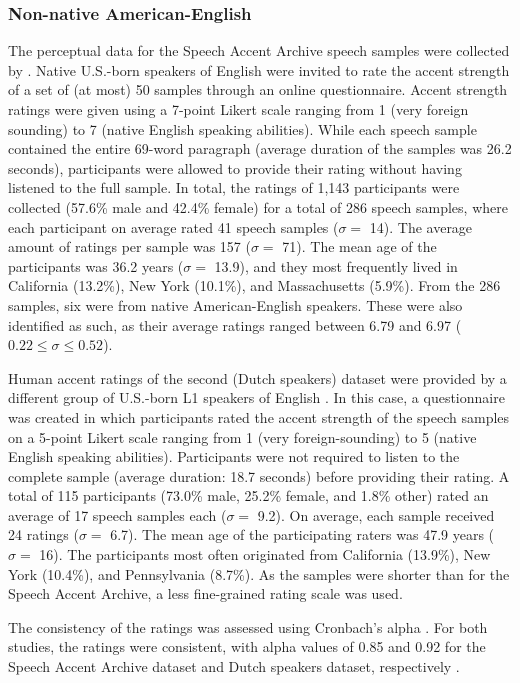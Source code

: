 \documentclass[11pt,a4paper]{article}
\begin{document}
\subsubsection{Non-native American-English}
The perceptual data for the Speech Accent Archive speech samples were collected by \citet{wieling2014a}. 
Native U.S.-born speakers of English were invited to rate the accent strength of a set of (at most) 50 samples through an online questionnaire.
Accent strength ratings were given using a 7-point Likert scale ranging from 1 (very foreign sounding) to 7 (native English speaking abilities).
While each speech sample contained the entire 69-word paragraph (average duration of the samples was 26.2 seconds), participants were allowed to provide their rating without having listened to the full sample.
In total, the ratings of 1,143 participants were collected (57.6\% male and 42.4\% female) for a total of 286 speech samples, where each participant on average rated 41 speech samples ($\sigma=$ 14). The average amount of ratings per sample was 157 ($\sigma=$ 71). The mean age of the participants was 36.2 years ($\sigma=$ 13.9), and they most frequently lived in California (13.2\%), New York (10.1\%), and Massachusetts (5.9\%). From the 286 samples, six were from native American-English speakers. These were also identified as such, as their average ratings ranged between 6.79 and 6.97 ($0.22 \leq \sigma \leq 0.52$). 

Human accent ratings of the second (Dutch speakers) dataset were provided by a different group of U.S.-born L1 speakers of English \citep{wielinglowlands}. 
In this case, a questionnaire was created in which participants rated the accent strength of the speech samples on a 5-point Likert scale ranging from 1 (very foreign-sounding) to 5 (native English speaking abilities). Participants were not required to listen to the complete sample (average duration: 18.7 seconds) before providing their rating. A total of 115 participants (73.0\% male, 25.2\% female, and 1.8\% other) rated an average of 17 speech samples each ($\sigma=$ 9.2).
On average, each sample received 24 ratings ($\sigma=$ 6.7). The mean age of the participating raters was 47.9 years ($\sigma=$ 16). 
The participants most often originated from California (13.9\%), New York (10.4\%), and Pennsylvania (8.7\%). As the samples were shorter than for the Speech Accent Archive, a less fine-grained rating scale was used.  

The consistency of the ratings was assessed using Cronbach's alpha \citep{cronbach1951coefficient}. For both studies, the ratings were consistent, with alpha values of 0.85 and 0.92 for the Speech Accent Archive dataset and Dutch speakers dataset, respectively \citep{nunnally1978}.
\end{document}

